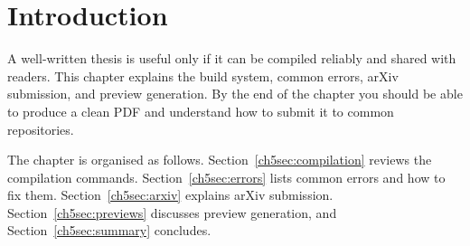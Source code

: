 \section{Introduction}\label{ch5sec:build-intro}

A well-written thesis is useful only if it can be compiled reliably and shared with readers. This chapter explains the build system, common errors, arXiv submission, and preview generation. By the end of the chapter you should be able to produce a clean PDF and understand how to submit it to common repositories.

\begin{figure}[t]
\centering
{}
\label{ch5fig:dataset-overview}
\end{figure}

The chapter is organised as follows. Section~\ref{ch5sec:compilation} reviews the compilation commands. Section~\ref{ch5sec:errors} lists common errors and how to fix them. Section~\ref{ch5sec:arxiv} explains arXiv submission. Section~\ref{ch5sec:previews} discusses preview generation, and Section~\ref{ch5sec:summary} concludes.
